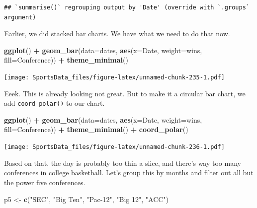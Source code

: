 \documentclass[
]{book}
\newenvironment{Shaded}{\begin{snugshade}}{\end{snugshade}}
\newcommand{\DataTypeTok}[1]{\textcolor[rgb]{0.13,0.29,0.53}{#1}}
\newcommand{\KeywordTok}[1]{\textcolor[rgb]{0.13,0.29,0.53}{\textbf{#1}}}
\newcommand{\NormalTok}[1]{#1}
\newcommand{\OperatorTok}[1]{\textcolor[rgb]{0.81,0.36,0.00}{\textbf{#1}}}
\newcommand{\StringTok}[1]{\textcolor[rgb]{0.31,0.60,0.02}{#1}}
\begin{document}
\begin{verbatim}
## `summarise()` regrouping output by 'Date' (override with `.groups` argument)
\end{verbatim}

Earlier, we did stacked bar charts. We have what we need to do that now.

\begin{Shaded}
\begin{Highlighting}[]
\KeywordTok{ggplot}\NormalTok{() }\OperatorTok{+}\StringTok{ }\KeywordTok{geom_bar}\NormalTok{(}\DataTypeTok{data=}\NormalTok{dates, }\KeywordTok{aes}\NormalTok{(}\DataTypeTok{x=}\NormalTok{Date, }\DataTypeTok{weight=}\NormalTok{wins, }\DataTypeTok{fill=}\NormalTok{Conference)) }\OperatorTok{+}\StringTok{ }\KeywordTok{theme_minimal}\NormalTok{()}
\end{Highlighting}
\end{Shaded}

\texttt{[image: SportsData\_files/figure-latex/unnamed-chunk-235-1.pdf]}

Eeek. This is already looking not great. But to make it a circular bar chart, we add \texttt{coord\_polar()} to our chart.

\begin{Shaded}
\begin{Highlighting}[]
\KeywordTok{ggplot}\NormalTok{() }\OperatorTok{+}\StringTok{ }\KeywordTok{geom_bar}\NormalTok{(}\DataTypeTok{data=}\NormalTok{dates, }\KeywordTok{aes}\NormalTok{(}\DataTypeTok{x=}\NormalTok{Date, }\DataTypeTok{weight=}\NormalTok{wins, }\DataTypeTok{fill=}\NormalTok{Conference)) }\OperatorTok{+}\StringTok{ }\KeywordTok{theme_minimal}\NormalTok{() }\OperatorTok{+}\StringTok{ }\KeywordTok{coord_polar}\NormalTok{()}
\end{Highlighting}
\end{Shaded}

\texttt{[image: SportsData\_files/figure-latex/unnamed-chunk-236-1.pdf]}

Based on that, the day is probably too thin a slice, and there's way too many conferences in college basketball. Let's group this by months and filter out all but the power five conferences.

\begin{Shaded}
\begin{Highlighting}[]
\NormalTok{p5 <-}\StringTok{ }\KeywordTok{c}\NormalTok{(}\StringTok{"SEC"}\NormalTok{, }\StringTok{"Big Ten"}\NormalTok{, }\StringTok{"Pac-12"}\NormalTok{, }\StringTok{"Big 12"}\NormalTok{, }\StringTok{"ACC"}\NormalTok{)}
\end{Highlighting}
\end{Shaded}
\end{document}
